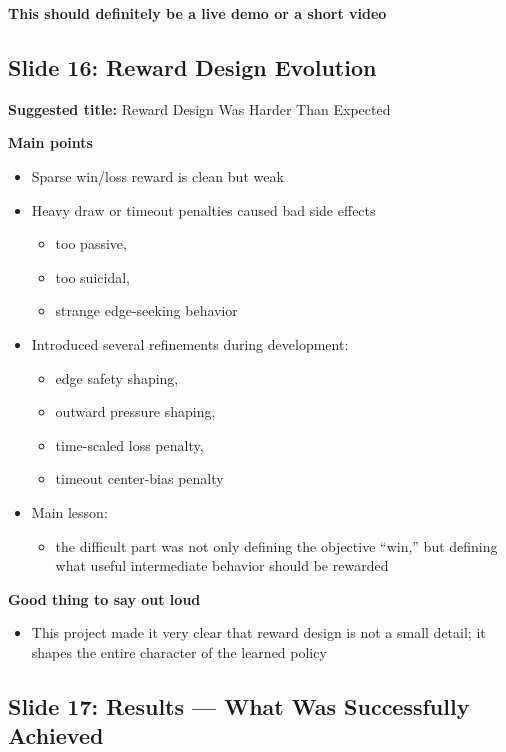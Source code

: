 \documentclass[11pt]{article}
\begin{document}
\textbf{This should definitely be a live demo or a short video}

\subsection*{Slide 16: Reward Design Evolution}

\textbf{Suggested title:} Reward Design Was Harder Than Expected

\textbf{Main points}
\begin{itemize}
    \item Sparse win/loss reward is clean but weak
    \item Heavy draw or timeout penalties caused bad side effects
    \begin{itemize}
        \item too passive,
        \item too suicidal,
        \item strange edge-seeking behavior
    \end{itemize}
    \item Introduced several refinements during development:
    \begin{itemize}
        \item edge safety shaping,
        \item outward pressure shaping,
        \item time-scaled loss penalty,
        \item timeout center-bias penalty
    \end{itemize}
    \item Main lesson:
    \begin{itemize}
        \item the difficult part was not only defining the objective ``win,'' but defining what useful intermediate behavior should be rewarded
    \end{itemize}
\end{itemize}

\textbf{Good thing to say out loud}
\begin{itemize}
    \item This project made it very clear that reward design is not a small detail; it shapes the entire character of the learned policy
\end{itemize}

\subsection*{Slide 17: Results --- What Was Successfully Achieved}
\end{document}
